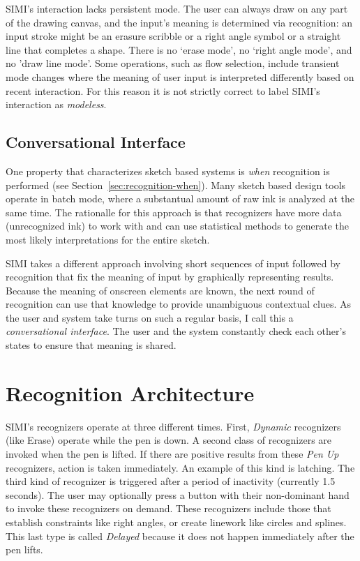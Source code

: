SIMI's interaction lacks persistent mode. The user can always draw on
any part of the drawing canvas, and the input's meaning is determined
via recognition: an input stroke might be an erasure scribble or a
right angle symbol or a straight line that completes a shape. There is
no `erase mode', no `right angle mode', and no 'draw line mode'. Some
operations, such as flow selection, include transient mode changes
where the meaning of user input is interpreted differently based on
recent interaction. For this reason it is not strictly correct to
label SIMI's interaction as \textit{modeless}.

\subsection{Conversational Interface}

One property that characterizes sketch based systems is \textit{when}
recognition is performed (see
Section~\ref{sec:recognition-when}). Many sketch based design tools
operate in batch mode, where a substantual amount of raw ink is
analyzed at the same time. The rationalle for this approach is that
recognizers have more data (unrecognized ink) to work with and can use
statistical methods to generate the most likely interpretations for
the entire sketch.

SIMI takes a different approach involving short sequences of input
followed by recognition that fix the meaning of input by graphically
representing results. Because the meaning of onscreen elements are
known, the next round of recognition can use that knowledge to provide
unambiguous contextual clues. As the user and system take turns on
such a regular basis, I call this a \textit{conversational
  interface}. The user and the system constantly check each other's
states to ensure that meaning is shared.

\section{Recognition Architecture}
\label{sec:recognition-architecture}

SIMI's recognizers operate at three different times. First,
\textit{Dynamic} recognizers (like Erase) operate while the pen is
down. A second class of recognizers are invoked when the pen is
lifted. If there are positive results from these \textit{Pen Up}
recognizers, action is taken immediately. An example of this kind is
latching. The third kind of recognizer is triggered after a period of
inactivity (currently 1.5 seconds). The user may optionally press a
button with their non-dominant hand to invoke these recognizers on
demand. These recognizers include those that establish constraints
like right angles, or create linework like circles and splines. This
last type is called \textit{Delayed} because it does not happen
immediately after the pen lifts.

